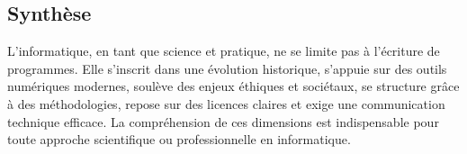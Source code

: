 \subsection{Synthèse}
L’informatique, en tant que science et pratique, ne se limite pas à l’écriture de programmes. Elle s’inscrit dans une évolution historique, s’appuie sur des outils numériques modernes, soulève des enjeux éthiques et sociétaux, se structure grâce à des méthodologies, repose sur des licences claires et exige une communication technique efficace. La compréhension de ces dimensions est indispensable pour toute approche scientifique ou professionnelle en informatique.
